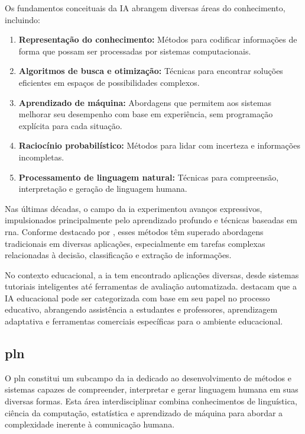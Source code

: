 Os fundamentos conceituais da IA abrangem diversas áreas do conhecimento, incluindo:

\begin{enumerate}
  \item \textbf{Representação do conhecimento:} Métodos para codificar informações de forma que possam ser processadas por sistemas computacionais.
  \item \textbf{Algoritmos de busca e otimização:} Técnicas para encontrar soluções eficientes em espaços de possibilidades complexos.
  \item \textbf{Aprendizado de máquina:} Abordagens que permitem aos sistemas melhorar seu desempenho com base em experiência, sem programação explícita para cada situação.
  \item \textbf{Raciocínio probabilístico:} Métodos para lidar com incerteza e informações incompletas.
  \item \textbf{Processamento de linguagem natural:} Técnicas para compreensão, interpretação e geração de linguagem humana.
\end{enumerate}

Nas últimas décadas, o campo da \gls{ia} experimentou avanços expressivos, impulsionados principalmente pelo aprendizado profundo e técnicas baseadas em \gls{rna}. Conforme destacado por , esses métodos têm superado abordagens tradicionais em diversas aplicações, especialmente em tarefas complexas relacionadas à decisão, classificação e extração de informações.

No contexto educacional, a \gls{ia} tem encontrado aplicações diversas, desde sistemas tutoriais inteligentes até ferramentas de avaliação automatizada.  destacam que a IA educacional pode ser categorizada com base em seu papel no processo educativo, abrangendo assistência a estudantes e professores, aprendizagem adaptativa e ferramentas comerciais específicas para o ambiente educacional.

\subsection{\texorpdfstring{\gls{pln}}{PLN}}
\label{subsec:pln}

O \gls{pln} constitui um subcampo da \gls{ia} dedicado ao desenvolvimento de métodos e sistemas capazes de compreender, interpretar e gerar linguagem humana em suas diversas formas. Esta área interdisciplinar combina conhecimentos de linguística, ciência da computação, estatística e aprendizado de máquina para abordar a complexidade inerente à comunicação humana.

